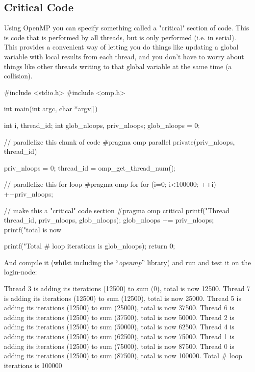 \subsection{Critical Code}

Using OpenMP you can specify something called a "critical" section of code.
This is code that is performed by all threads, but is only performed
 (i.e. in serial). This provides a convenient way
of letting you do things like updating a global variable with local results
from each thread, and you don't have to worry about things like other threads
writing to that global variable at the same time (a collision).

\begin{prompt}
#include <stdio.h>
#include <omp.h>

int main(int argc, char *argv[])
{
    int i, thread_id;
    int glob_nloops, priv_nloops;
    glob_nloops = 0;

    // parallelize this chunk of code
    #pragma omp parallel private(priv_nloops, thread_id)
    {
        priv_nloops = 0;
        thread_id = omp_get_thread_num();

        // parallelize this for loop
        #pragma omp for
        for (i=0; i<100000; ++i)
        {
            ++priv_nloops;
        }

        // make this a "critical" code section
        #pragma omp critical
        {
            printf("Thread %
                   thread_id, priv_nloops, glob_nloops);
            glob_nloops += priv_nloops;
            printf("total is now %
        }
    }
    printf("Total # loop iterations is %
           glob_nloops);
    return 0;
}
\end{prompt}

And compile it (whilst including the ``\emph{openmp}'' library) and run and test it on the login-node:

\begin{prompt}
Thread 3 is adding its iterations (12500) to sum (0), total is now 12500.
Thread 7 is adding its iterations (12500) to sum (12500), total is now 25000.
Thread 5 is adding its iterations (12500) to sum (25000), total is now 37500.
Thread 6 is adding its iterations (12500) to sum (37500), total is now 50000.
Thread 2 is adding its iterations (12500) to sum (50000), total is now 62500.
Thread 4 is adding its iterations (12500) to sum (62500), total is now 75000.
Thread 1 is adding its iterations (12500) to sum (75000), total is now 87500.
Thread 0 is adding its iterations (12500) to sum (87500), total is now 100000.
Total # loop iterations is 100000
\end{prompt}


